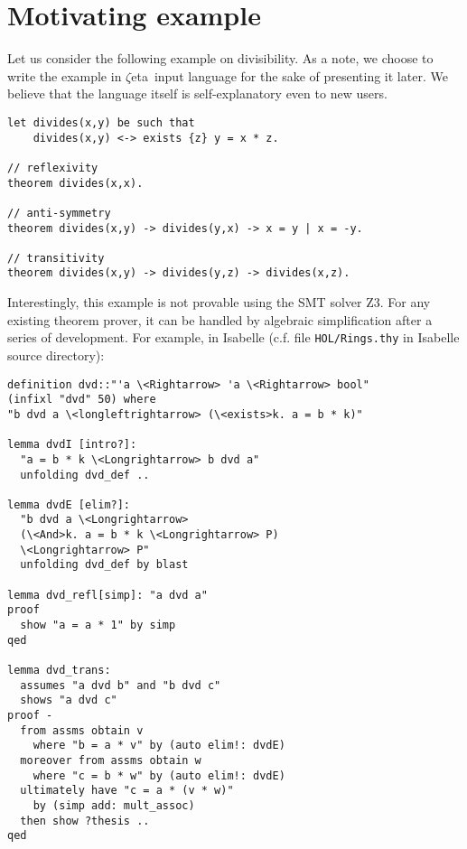\documentclass[12pt]{article}
\newcommand{\zetatp}{$\zeta$eta}
\begin{document}
\section{Motivating example}

Let us consider the following example on divisibility. As a note, we choose to write the example in \zetatp\ input language for the sake of presenting it later. We believe that the language itself is self-explanatory even to new users.

\begin{lstlisting}
let divides(x,y) be such that
    divides(x,y) <-> exists {z} y = x * z.

// reflexivity
theorem divides(x,x).

// anti-symmetry
theorem divides(x,y) -> divides(y,x) -> x = y | x = -y.

// transitivity
theorem divides(x,y) -> divides(y,z) -> divides(x,z).
\end{lstlisting}

Interestingly, this example is not provable using the SMT solver Z3. For any existing theorem prover, it can be handled by algebraic simplification after a series of development. For example, in Isabelle (c.f. file \texttt{HOL/Rings.thy} in Isabelle source directory):

\begin{lstlisting}
definition dvd::"'a \<Rightarrow> 'a \<Rightarrow> bool"
(infixl "dvd" 50) where
"b dvd a \<longleftrightarrow> (\<exists>k. a = b * k)"

lemma dvdI [intro?]:
  "a = b * k \<Longrightarrow> b dvd a"
  unfolding dvd_def ..

lemma dvdE [elim?]:
  "b dvd a \<Longrightarrow> 
  (\<And>k. a = b * k \<Longrightarrow> P)
  \<Longrightarrow> P"
  unfolding dvd_def by blast 
  
lemma dvd_refl[simp]: "a dvd a"
proof
  show "a = a * 1" by simp
qed

lemma dvd_trans:
  assumes "a dvd b" and "b dvd c"
  shows "a dvd c"
proof -
  from assms obtain v
    where "b = a * v" by (auto elim!: dvdE)
  moreover from assms obtain w 
    where "c = b * w" by (auto elim!: dvdE)
  ultimately have "c = a * (v * w)" 
    by (simp add: mult_assoc)
  then show ?thesis ..
qed
\end{lstlisting}
\end{document}
